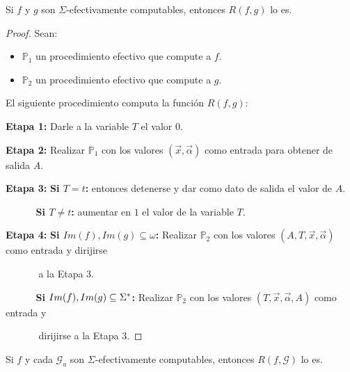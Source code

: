   \begin{lemma}
    \PN Si $f$ y $g$ son $\Sigma $-efectivamente computables, entonces $R(f,g)$ lo es.
  \end{lemma}
  \begin{proof}
    \PN Sean:

    \begin{itemize}
      \item $\mathbb{P}_{1}$ un procedimiento efectivo que compute a $f$.
      \item $\mathbb{P}_{2}$ un procedimiento efectivo que compute a $g$.
    \end{itemize}

    \PN El siguiente procedimiento computa la función $R(f,g)$:

    \vspace{3mm}
    \PN \textbf{Etapa 1:}
    Darle a la variable $T$ el valor $0$.

    \PN \textbf{Etapa 2:}
    Realizar $\mathbb{P}_{1}$ con los valores $(\vec{x}, \vec{\alpha})$ como entrada para obtener de salida $A$.

    \PN \textbf{Etapa 3:}
    \textbf{Si $T = t$:} entonces detenerse y dar como dato de salida el valor de $A$.

    $\qquad\;\;\;\;$\textbf{Si $T \neq t$:} aumentar en $1$ el valor de la variable $T$.

    \PN \textbf{Etapa 4:}
    \textbf{Si $Im(f), Im(g) \subseteq \omega$:} Realizar $\mathbb{P}_{2}$ con los valores $(A, T, \vec{x},
    \vec{\alpha})$ como entrada y dirijirse

    $\qquad\;\;\;\;\;$a la Etapa 3.

    $\qquad\;\;\;\;$\textbf{Si $Im(f), Im(g) \subseteq \Sigma^{\ast}$:} Realizar $\mathbb{P}_{2}$ con los valores $(T,
    \vec{x}, \vec{\alpha}, A)$ como entrada y

    $\qquad\;\;\;\;\;$dirijirse a la Etapa 3.
  \end{proof}

  \begin{lemma}
    \PN Si $f$ y cada $\mathcal{G}_{a}$ son $\Sigma$-efectivamente computables, entonces $R(f,\mathcal{G})$ lo es.
  \end{lemma}

